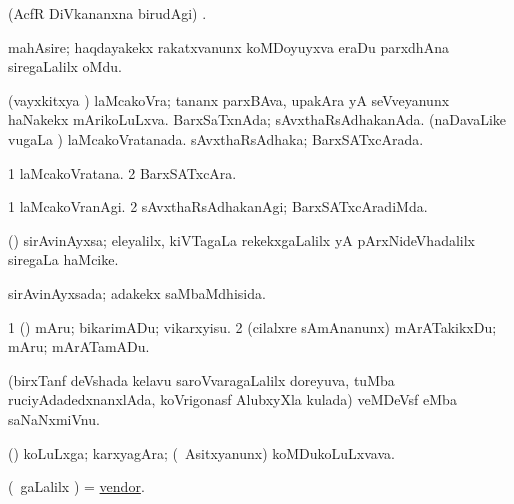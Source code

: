 \bentry
{}
\gl{\saMkiSx}
\expl{}
\bmng
 (AcfR DiVkananxna birudAgi) . 
\emng
\eentry

\bentry
{} 
\gl{\nA}
\bmng
 mahAsire; haqdayakekx rakatxvanunx koMDoyuyxva eraDu parxdhAna siregaLalilx oMdu. 
\emng
\eentry

\bentry
{} 
\gl{\gu}
\expl{}
\bmng
\bnum
{} (vayxkitxya \vi) 
\banum
{} laMcakoVra; tananx parxBAva, upakAra yA seVveyanunx haNakekx mArikoLuLxva. 
 BarxSaTxnAda; sAvxthaRsAdhakanAda. 
\eanum
\numie
{} (naDavaLike \mo vugaLa \vi) 
\banum
{} laMcakoVratanada. 
 sAvxthaRsAdhaka; BarxSATxcArada. 
\eanum
\numie
\enum
\emng
\eentry

\bentry
{} 
\gl{\nA}
\expl{}
\bmng
\bnum
\num{1} laMcakoVratana. 
\num{2} BarxSATxcAra. 
\enum
\emng
\eentry

\bentry
{} 
\gl{\kirxvi}
\expl{}
\bmng
\bnum
\num{1} laMcakoVranAgi. 
\num{2} sAvxthaRsAdhakanAgi; BarxSATxcAradiMda. 
\enum
\emng
\eentry

\bentry
{} 
\gl{\nA}
\bmng
 (\savi) sirAvinAyxsa; eleyalilx, kiVTagaLa rekekxgaLalilx yA pArxNideVhadalilx siregaLa haMcike.  
\emng
\eentry

\bentry
{} 
\gl{\gu}
\expl{}
\bmng
 sirAvinAyxsada; adakekx saMbaMdhisida. 
\emng
\eentry

\bentry
{} 
\gl{\sakirx}
\expl{}
\bmng
\bnum
\num{1} (\nAyxshA) mAru; bikarimADu; vikarxyisu. 
\num{2} (cilalxre sAmAnanunx) mArATakikxDu; mAru; mArATamADu. 
\enum
\emng
\eentry

\bentry
{} 
\gl{\nA}
\expl{}
\bmng
 (birxTanf deVshada kelavu saroVvaragaLalilx doreyuva, tuMba ruciyAdadedxnanxlAda, koVrigonasf AlubxyXla kulada) veMDeVsf eMba saNaNxmiVnu. 
\emng
\eentry

\bentry
{} 
\gl{\nA}
\expl{}
\bmng
 (\nAyxshA) koLuLxga; karxyagAra; (\kanmu\ Asitxyanunx) koMDukoLuLxvava. 
\emng
\eentry

\bentry
{} 
\gl{\nA}
\expl{}
\bmng
 (\sA\ \saMpa gaLalilx \parx) = \hyperlink{vendor}{vendor}. 
\emng
\eentry


